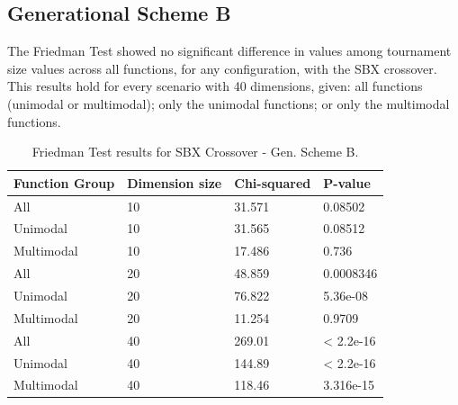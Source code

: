 \subsection{Generational Scheme B}


The Friedman Test showed no significant difference in values among tournament size values across all functions, for any configuration, with the SBX crossover. This results hold for every scenario with 40 dimensions, given: all functions (unimodal or multimodal); only the unimodal functions; or only the multimodal functions. 

\begin{table}[h]
	\centering
	\begin{tabular}{|l|l|l|l|}
		\hline
		\textbf{Function Group} & \textbf{Dimension size}      & \textbf{Chi-squared}        & \textbf{P-value}                     \\ \hline
		\multicolumn{1}{|l|}{All} & \multicolumn{1}{|l|}{10} & \multicolumn{1}{l|}{31.571} & \multicolumn{1}{l|}{0.08502} \\ \hline
		\multicolumn{1}{|l|}{Unimodal} & \multicolumn{1}{|l|}{10} & \multicolumn{1}{l|}{31.565} & \multicolumn{1}{l|}{0.08512} \\ \hline
		\multicolumn{1}{|l|}{Multimodal} & \multicolumn{1}{|l|}{10} & \multicolumn{1}{l|}{17.486} & \multicolumn{1}{l|}{0.736}  \\ \hline
		\hline
		\multicolumn{1}{|l|}{All} & \multicolumn{1}{|l|}{20} & \multicolumn{1}{l|}{48.859} & \multicolumn{1}{l|}{0.0008346} \\ \hline
		\multicolumn{1}{|l|}{Unimodal} & \multicolumn{1}{|l|}{20} & \multicolumn{1}{l|}{76.822} & \multicolumn{1}{l|}{5.36e-08} \\ \hline
		\multicolumn{1}{|l|}{Multimodal} & \multicolumn{1}{|l|}{20} & \multicolumn{1}{l|}{11.254} & \multicolumn{1}{l|}{0.9709}  \\ \hline
		\hline	
		\multicolumn{1}{|l|}{All} & \multicolumn{1}{|l|}{40} & \multicolumn{1}{l|}{269.01} & \multicolumn{1}{l|}{< 2.2e-16} 						\\ \hline
		\multicolumn{1}{|l|}{Unimodal} & \multicolumn{1}{|l|}{40} & \multicolumn{1}{l|}{144.89} & \multicolumn{1}{l|}{< 2.2e-16} \\ \hline
		\multicolumn{1}{|l|}{Multimodal} & \multicolumn{1}{|l|}{40} & \multicolumn{1}{l|}{118.46} & \multicolumn{1}{l|}{3.316e-15}  \\ \hline
	\end{tabular}
	\caption{Friedman Test results for SBX Crossover - Gen. Scheme B.}
	\label{Friedman_test_uniform-B}	
\end{table}

